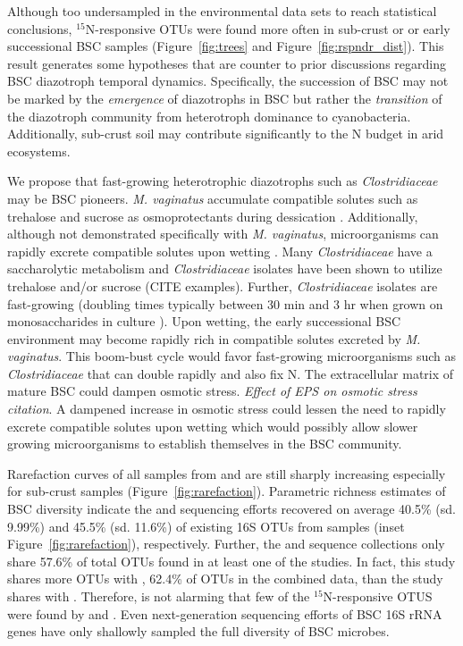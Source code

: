 Although too undersampled in the environmental data sets to reach statistical
conclusions, $^{15}$N-responsive OTUs were found more often in sub-crust or
or early successional BSC samples (Figure~\ref{fig:trees} and
Figure~\ref{fig:rspndr_dist}).  This result generates some hypotheses that are
counter to prior discussions regarding BSC diazotroph temporal dynamics.
Specifically, the succession of BSC may not be marked by the \textit{emergence}
of diazotrophs in BSC but rather the \textit{transition} of the diazotroph
community from heterotroph dominance to cyanobacteria.  Additionally,
sub-crust soil may contribute significantly to the N budget in arid ecosystems.

We propose that fast-growing heterotrophic diazotrophs such as
\textit{Clostridiaceae} may be BSC pioneers. \textit{M. vaginatus}
accumulate compatible solutes such as trehalose and sucrose as osmoprotectants
during dessication \citep{Rajeev_2013}. Additionally, although not demonstrated specifically with \textit{M. vaginatus}, microorganisms can rapidly excrete 
compatible solutes upon wetting \citep{Poolman_1998}. Many \textit{Clostridiaceae} have a saccharolytic metabolism \citep{Wiegel_2006} and \textit{Clostridiaceae} isolates have been shown to utilize trehalose and/or sucrose (CITE examples). Further, \textit{Clostridiaceae} isolates are fast-growing (doubling times typically  between 30 min and 3 hr when grown on monosaccharides in culture \citep{Wiegel_2006}). Upon wetting, the early successional BSC environment may become rapidly rich in compatible solutes excreted by \textit{M. vaginatus}. This boom-bust cycle would favor fast-growing microorganisms such as \textit{Clostridiaceae} that can double
rapidly and also fix N. The extracellular matrix of mature BSC could
dampen osmotic stress. \textit{Effect of EPS on osmotic stress
citation}. A dampened increase in osmotic stress could lessen the need to
rapidly excrete compatible solutes upon wetting which would possibly allow
slower growing microorganisms to establish themselves in the BSC community.

Rarefaction curves of all samples from \citet{Steven_2013} and
\citet{Garcia_Pichel_2013} are still sharply increasing especially for
sub-crust samples (Figure~\ref{fig:rarefaction}). Parametric richness estimates
of BSC diversity indicate the \citet{Steven_2013} and
\citet{Garcia_Pichel_2013} sequencing efforts recovered on average 40.5\% (sd.
9.99\%) and 45.5\% (sd.  11.6\%) of existing 16S OTUs from samples (inset
Figure~\ref{fig:rarefaction}), respectively. Further, the \citet{Steven_2013}
and \citet{Garcia_Pichel_2013} sequence collections only share 57.6\% of total
OTUs found in at least one of the studies. In fact, this study shares more OTUs
with \citet{Steven_2013}, 62.4\% of OTUs in the combined data, than the
\citet{Steven_2013} study shares with \citet{Garcia_Pichel_2013}.  Therefore,
is not alarming that few of the $^{15}$N-responsive OTUS were found by
\citet{Garcia_Pichel_2013} and \citet{Steven_2013}. Even next-generation
sequencing efforts of BSC 16S rRNA genes have only shallowly sampled the full
diversity of BSC microbes.  

